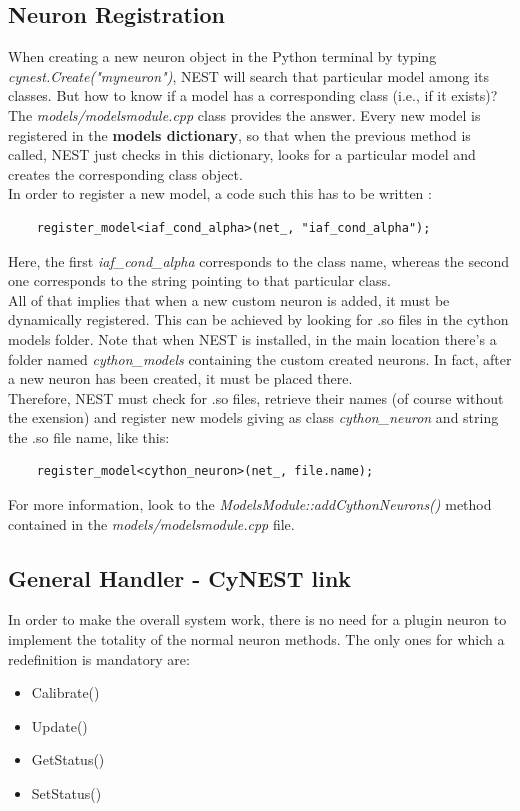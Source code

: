 \documentclass{article}
\begin{document}
\subsection{Neuron Registration}
When creating a new neuron object in the Python terminal by typing\\ \emph{cynest.Create("myneuron")}, NEST will search that particular model among its classes. But how to know if a model has a corresponding class (i.e., if it exists)? The \emph{models/modelsmodule.cpp} class provides the answer. Every new model is registered in the \textbf{models dictionary}, so that when the previous method is called, NEST just checks in this dictionary, looks for a particular model and creates the corresponding class object.\\
In order to register a new model, a code such this has to be written :
\begin{verbatim}
	register_model<iaf_cond_alpha>(net_, "iaf_cond_alpha");
\end{verbatim}
Here, the first \emph{iaf\_cond\_alpha} corresponds to the class name, whereas the second one corresponds to the string pointing to that particular class.\\
All of that implies that when a new custom neuron is added, it must be dynamically registered. This can be achieved by looking for .so files in the cython models folder. Note that when NEST is installed, in the main location there's a folder named \emph{cython\_models} containing the custom created neurons. In fact, after a new neuron has been created, it must be placed there.\\
Therefore, NEST must check for .so files, retrieve their names (of course without the exension) and  register new models giving as class \emph{cython\_neuron} and string the .so file name, like this:
\begin{verbatim}
	register_model<cython_neuron>(net_, file.name);
\end{verbatim}
For more information, look to the \emph{ModelsModule::addCythonNeurons()} method contained in the \emph{models/modelsmodule.cpp} file.

\subsection{General Handler - CyNEST link}
In order to make the overall system work, there is no need for a plugin neuron to implement the totality of the normal neuron methods. The only ones for which a redefinition is mandatory are:
\begin{itemize}
\item Calibrate()
\item Update()
\item GetStatus()
\item SetStatus()
\end{itemize}
\end{document}

